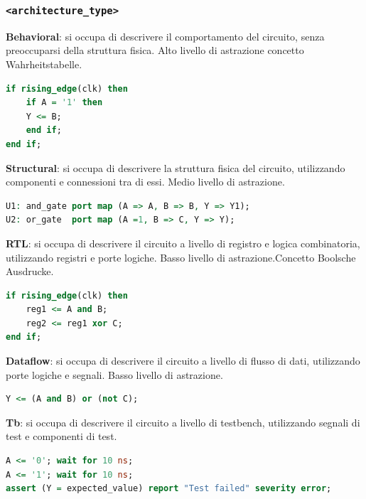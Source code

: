         \subsubsection{\texttt{<architecture\_type>}}
            \textbf{Behavioral}: si occupa di descrivere il comportamento del circuito, senza preoccuparsi della struttura fisica. Alto livello di astrazione concetto Wahrheitstabelle.
            \begin{lstlisting}[language=VHDL]
if rising_edge(clk) then
    if A = '1' then
    Y <= B;
    end if;
end if;
            \end{lstlisting}

            \textbf{Structural}: si occupa di descrivere la struttura fisica del circuito, utilizzando componenti e connessioni tra di essi. Medio livello di astrazione.
            \begin{lstlisting}[language=VHDL]
U1: and_gate port map (A => A, B => B, Y => Y1);
U2: or_gate  port map (A =1, B => C, Y => Y);
            \end{lstlisting}

            \textbf{RTL}: si occupa di descrivere il circuito a livello di registro e logica combinatoria, utilizzando registri e porte logiche. Basso livello di astrazione.Concetto Boolsche Ausdrucke.
            \begin{lstlisting}[language=VHDL]
if rising_edge(clk) then
    reg1 <= A and B;
    reg2 <= reg1 xor C;
end if;
            \end{lstlisting}

            \textbf{Dataflow}: si occupa di descrivere il circuito a livello di flusso di dati, utilizzando porte logiche e segnali. Basso livello di astrazione.
            \begin{lstlisting}[language=VHDL]
Y <= (A and B) or (not C);
            \end{lstlisting}

            \textbf{Tb}: si occupa di descrivere il circuito a livello di testbench, utilizzando segnali di test e componenti di test.
            \begin{lstlisting}[language=VHDL]
A <= '0'; wait for 10 ns;
A <= '1'; wait for 10 ns;
assert (Y = expected_value) report "Test failed" severity error;
            \end{lstlisting}

